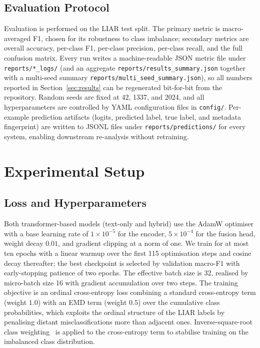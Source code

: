 \documentclass[journal]{IEEEtran}
\begin{document}
\subsection{Evaluation Protocol}
Evaluation is performed on the LIAR test split. The primary metric is macro-averaged F1, chosen for its robustness to class imbalance; secondary metrics are overall accuracy, per-class F1, per-class precision, per-class recall, and the full confusion matrix. Every run writes a machine-readable JSON metric file under \texttt{reports/*\_logs/} (and an aggregate \texttt{reports/results\_summary.json} together with a multi-seed summary \texttt{reports/multi\_seed\_summary.json}), so all numbers reported in Section~\ref{sec:results} can be regenerated bit-for-bit from the repository. Random seeds are fixed at 42, 1337, and 2024, and all hyperparameters are controlled by YAML configuration files in \texttt{config/}. Per-example prediction artifacts (logits, predicted label, true label, and metadata fingerprint) are written to JSONL files under \texttt{reports/predictions/} for every system, enabling downstream re-analysis without retraining.

\section{Experimental Setup}
\label{sec:setup}

\subsection{Loss and Hyperparameters}
Both transformer-based models (text-only and hybrid) use the AdamW optimiser with a base learning rate of $1 \times 10^{-5}$ for the encoder, $5 \times 10^{-4}$ for the fusion head, weight decay $0.01$, and gradient clipping at a norm of one. We train for at most ten epochs with a linear warmup over the first 115 optimisation steps and cosine decay thereafter; the best checkpoint is selected by validation macro-F1 with early-stopping patience of two epochs. The effective batch size is 32, realised by micro-batch size 16 with gradient accumulation over two steps. The training objective is an ordinal cross-entropy loss combining a standard cross-entropy term (weight $1.0$) with an EMD term (weight $0.5$) over the cumulative class probabilities, which exploits the ordinal structure of the LIAR labels by penalising distant misclassifications more than adjacent ones. Inverse-square-root class weighting~\cite{raza2025} is applied to the cross-entropy term to stabilise training on the imbalanced class distribution.
\end{document}
